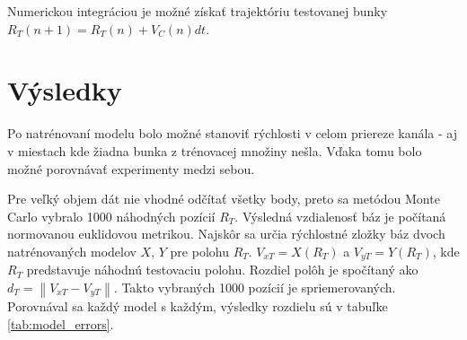 \documentclass[10pt,a4paper]{article}
\begin{document}
Numerickou integráciou je možné získať trajektóriu testovanej bunky $R_{T}(n+1) = R_{T}(n) + V_{C}(n)dt$.

\section{Výsledky}

Po natrénovaní modelu bolo možné stanoviť rýchlosti v celom priereze kanála -
aj v miestach kde žiadna bunka z trénovacej množiny nešla. Vďaka tomu
bolo možné porovnávať experimenty medzi sebou.

Pre veľký objem dát nie vhodné odčítať všetky body, preto sa metódou Monte Carlo vybralo 1000 náhodných pozícií $R_{T}$.
Výsledná vzdialenosť báz je počítaná normovanou euklidovou metrikou.
Najskôr sa určia rýchlostné zložky báz dvoch natrénovaných modelov $X$, $Y$ pre polohu $R_{T}$.
$V_{xT} = X(R_{T})$ a $V_{yT} = Y(R_{T})$, kde $R_{T}$ predstavuje náhodnú testovaciu polohu.
Rozdiel polôh je spočítaný ako $d_T = \left\lVert V_{xT} - V_{yT} \right\rVert$. Takto vybraných 1000 pozícií
je spriemerovaných. Porovnával sa každý model s každým, výsledky rozdielu sú v tabuľke \ref{tab:model_errors}.
\end{document}
